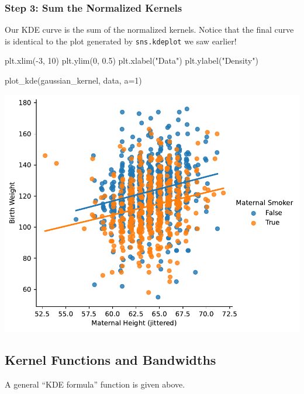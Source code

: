 \documentclass[
  letterpaper,
  DIV=11,
  numbers=noendperiod]{scrreprt}
\newenvironment{Shaded}{\begin{snugshade}}{\end{snugshade}}
\newcommand{\DecValTok}[1]{\textcolor[rgb]{0.68,0.00,0.00}{#1}}
\newcommand{\FloatTok}[1]{\textcolor[rgb]{0.68,0.00,0.00}{#1}}
\newcommand{\NormalTok}[1]{\textcolor[rgb]{0.00,0.23,0.31}{#1}}
\newcommand{\OperatorTok}[1]{\textcolor[rgb]{0.37,0.37,0.37}{#1}}
\newcommand{\StringTok}[1]{\textcolor[rgb]{0.13,0.47,0.30}{#1}}
\begin{document}
\subsubsection{Step 3: Sum the Normalized
Kernels}\label{step-3-sum-the-normalized-kernels}

Our KDE curve is the sum of the normalized kernels. Notice that the
final curve is identical to the plot generated by \texttt{sns.kdeplot}
we saw earlier!

\begin{Shaded}
\begin{Highlighting}[]
\NormalTok{plt.xlim(}\OperatorTok{{-}}\DecValTok{3}\NormalTok{, }\DecValTok{10}\NormalTok{)}
\NormalTok{plt.ylim(}\DecValTok{0}\NormalTok{, }\FloatTok{0.5}\NormalTok{)}
\NormalTok{plt.xlabel(}\StringTok{"Data"}\NormalTok{)}
\NormalTok{plt.ylabel(}\StringTok{"Density"}\NormalTok{)}

\NormalTok{plot\_kde(gaussian\_kernel, data, a}\OperatorTok{=}\DecValTok{1}\NormalTok{)}
\end{Highlighting}
\end{Shaded}

\includegraphics{visualization_2/visualization_2_files/figure-pdf/cell-10-output-1.pdf}

\subsection{Kernel Functions and
Bandwidths}\label{kernel-functions-and-bandwidths}

A general ``KDE formula'' function is given above.
\end{document}
